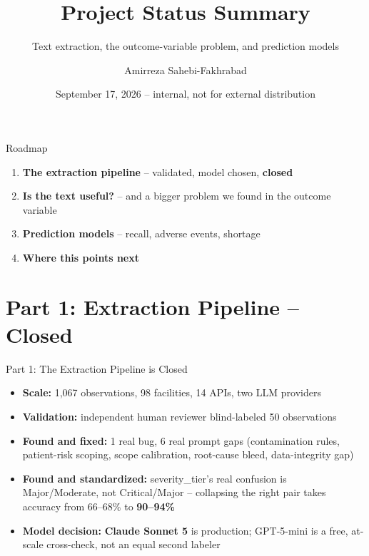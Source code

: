 \documentclass[aspectratio=169,10pt]{beamer}
\title[Project Status Summary]{Project Status Summary}
\subtitle{Text extraction, the outcome-variable problem, and prediction models}
\author[Sahebi-Fakhrabad]{Amirreza Sahebi-Fakhrabad}
\date{September 17, 2026 -- internal, not for external distribution}
\newcommand{\highlight}[1]{{\color{ncsuRed}\textbf{#1}}}
\newcommand{\tech}[1]{{\color{techBlue}\textbf{#1}}}
\begin{document}
\begin{frame}
\titlepage
\end{frame}

\begin{frame}{Roadmap}
\begin{enumerate}
  \setlength{\itemsep}{12pt}
  \item \textbf{The extraction pipeline} -- validated, model chosen, \highlight{closed}
  \item \textbf{Is the text useful?} -- and a bigger problem we found in the outcome variable
  \item \textbf{Prediction models} -- recall, adverse events, shortage
  \item \textbf{Where this points next}
\end{enumerate}
\end{frame}

\section{Part 1: Extraction Pipeline -- Closed}

\begin{frame}{Part 1: The Extraction Pipeline is Closed}
\begin{itemize}
  \setlength{\itemsep}{10pt}
  \item \textbf{Scale:} 1,067 observations, 98 facilities, 14 APIs, two LLM providers
  \item \textbf{Validation:} independent human reviewer blind-labeled 50 observations
  \item \textbf{Found and fixed:} 1 real bug, 6 real prompt gaps (contamination rules,
        patient-risk scoping, scope calibration, root-cause bleed, data-integrity gap)
  \item \textbf{Found and standardized:} severity\_tier's real confusion is
        Major/Moderate, not Critical/Major -- collapsing the right pair takes accuracy
        from 66--68\% to \highlight{90--94\%}
  \item \textbf{Model decision:} \tech{Claude Sonnet 5} is production; GPT-5-mini is a
        free, at-scale cross-check, not an equal second labeler
\end{itemize}
\end{frame}
\end{document}
